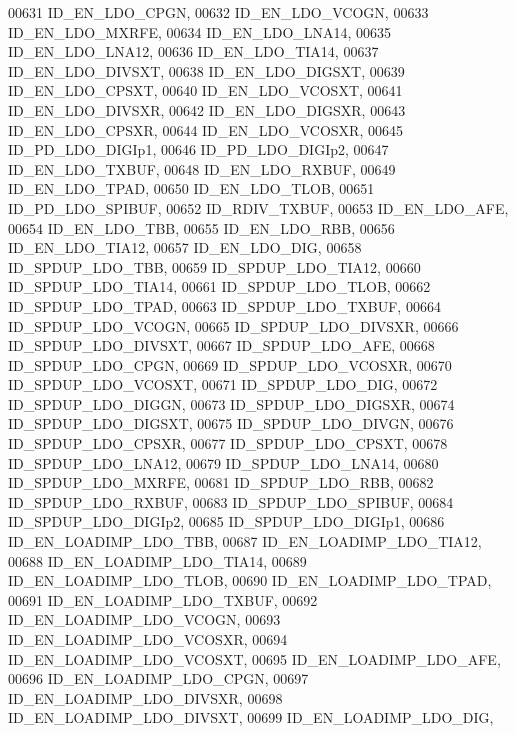 \begin{DoxyCode}
00631             ID_EN_LDO_CPGN,
00632             ID_EN_LDO_VCOGN,
00633             ID_EN_LDO_MXRFE,
00634             ID_EN_LDO_LNA14,
00635             ID_EN_LDO_LNA12,
00636             ID_EN_LDO_TIA14,
00637             ID_EN_LDO_DIVSXT,
00638             ID_EN_LDO_DIGSXT,
00639             ID_EN_LDO_CPSXT,
00640             ID_EN_LDO_VCOSXT,
00641             ID_EN_LDO_DIVSXR,
00642             ID_EN_LDO_DIGSXR,
00643             ID_EN_LDO_CPSXR,
00644             ID_EN_LDO_VCOSXR,
00645             ID_PD_LDO_DIGIp1,
00646             ID_PD_LDO_DIGIp2,
00647             ID_EN_LDO_TXBUF,
00648             ID_EN_LDO_RXBUF,
00649             ID_EN_LDO_TPAD,
00650             ID_EN_LDO_TLOB,
00651             ID_PD_LDO_SPIBUF,
00652             ID_RDIV_TXBUF,
00653             ID_EN_LDO_AFE,
00654             ID_EN_LDO_TBB,
00655             ID_EN_LDO_RBB,
00656             ID_EN_LDO_TIA12,
00657             ID_EN_LDO_DIG,
00658             ID_SPDUP_LDO_TBB,
00659             ID_SPDUP_LDO_TIA12,
00660             ID_SPDUP_LDO_TIA14,
00661             ID_SPDUP_LDO_TLOB,
00662             ID_SPDUP_LDO_TPAD,
00663             ID_SPDUP_LDO_TXBUF,
00664             ID_SPDUP_LDO_VCOGN,
00665             ID_SPDUP_LDO_DIVSXR,
00666             ID_SPDUP_LDO_DIVSXT,
00667             ID_SPDUP_LDO_AFE,
00668             ID_SPDUP_LDO_CPGN,
00669             ID_SPDUP_LDO_VCOSXR,
00670             ID_SPDUP_LDO_VCOSXT,
00671             ID_SPDUP_LDO_DIG,
00672             ID_SPDUP_LDO_DIGGN,
00673             ID_SPDUP_LDO_DIGSXR,
00674             ID_SPDUP_LDO_DIGSXT,
00675             ID_SPDUP_LDO_DIVGN,
00676             ID_SPDUP_LDO_CPSXR,
00677             ID_SPDUP_LDO_CPSXT,
00678             ID_SPDUP_LDO_LNA12,
00679             ID_SPDUP_LDO_LNA14,
00680             ID_SPDUP_LDO_MXRFE,
00681             ID_SPDUP_LDO_RBB,
00682             ID_SPDUP_LDO_RXBUF,
00683             ID_SPDUP_LDO_SPIBUF,
00684             ID_SPDUP_LDO_DIGIp2,
00685             ID_SPDUP_LDO_DIGIp1,
00686             ID_EN_LOADIMP_LDO_TBB,
00687             ID_EN_LOADIMP_LDO_TIA12,
00688             ID_EN_LOADIMP_LDO_TIA14,
00689             ID_EN_LOADIMP_LDO_TLOB,
00690             ID_EN_LOADIMP_LDO_TPAD,
00691             ID_EN_LOADIMP_LDO_TXBUF,
00692             ID_EN_LOADIMP_LDO_VCOGN,
00693             ID_EN_LOADIMP_LDO_VCOSXR,
00694             ID_EN_LOADIMP_LDO_VCOSXT,
00695             ID_EN_LOADIMP_LDO_AFE,
00696             ID_EN_LOADIMP_LDO_CPGN,
00697             ID_EN_LOADIMP_LDO_DIVSXR,
00698             ID_EN_LOADIMP_LDO_DIVSXT,
00699             ID_EN_LOADIMP_LDO_DIG,

\end{DoxyCode}

